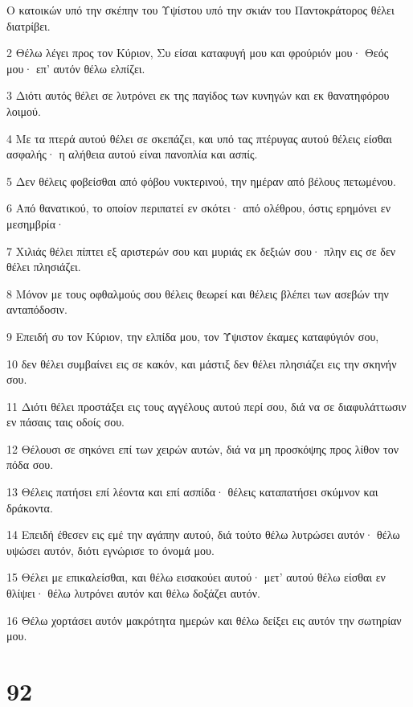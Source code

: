 \par Ο κατοικών υπό την σκέπην του Υψίστου υπό την σκιάν του Παντοκράτορος θέλει διατρίβει.
\par 2 Θέλω λέγει προς τον Κύριον, Συ είσαι καταφυγή μου και φρούριόν μου· Θεός μου· επ' αυτόν θέλω ελπίζει.
\par 3 Διότι αυτός θέλει σε λυτρόνει εκ της παγίδος των κυνηγών και εκ θανατηφόρου λοιμού.
\par 4 Με τα πτερά αυτού θέλει σε σκεπάζει, και υπό τας πτέρυγας αυτού θέλεις είσθαι ασφαλής· η αλήθεια αυτού είναι πανοπλία και ασπίς.
\par 5 Δεν θέλεις φοβείσθαι από φόβου νυκτερινού, την ημέραν από βέλους πετωμένου.
\par 6 Από θανατικού, το οποίον περιπατεί εν σκότει· από ολέθρου, όστις ερημόνει εν μεσημβρία·
\par 7 Χιλιάς θέλει πίπτει εξ αριστερών σου και μυριάς εκ δεξιών σου· πλην εις σε δεν θέλει πλησιάζει.
\par 8 Μόνον με τους οφθαλμούς σου θέλεις θεωρεί και θέλεις βλέπει των ασεβών την ανταπόδοσιν.
\par 9 Επειδή συ τον Κύριον, την ελπίδα μου, τον Ύψιστον έκαμες καταφύγιόν σου,
\par 10 δεν θέλει συμβαίνει εις σε κακόν, και μάστιξ δεν θέλει πλησιάζει εις την σκηνήν σου.
\par 11 Διότι θέλει προστάξει εις τους αγγέλους αυτού περί σου, διά να σε διαφυλάττωσιν εν πάσαις ταις οδοίς σου.
\par 12 Θέλουσι σε σηκόνει επί των χειρών αυτών, διά να μη προσκόψης προς λίθον τον πόδα σου.
\par 13 Θέλεις πατήσει επί λέοντα και επί ασπίδα· θέλεις καταπατήσει σκύμνον και δράκοντα.
\par 14 Επειδή έθεσεν εις εμέ την αγάπην αυτού, διά τούτο θέλω λυτρώσει αυτόν· θέλω υψώσει αυτόν, διότι εγνώρισε το όνομά μου.
\par 15 Θέλει με επικαλείσθαι, και θέλω εισακούει αυτού· μετ' αυτού θέλω είσθαι εν θλίψει· θέλω λυτρόνει αυτόν και θέλω δοξάζει αυτόν.
\par 16 Θέλω χορτάσει αυτόν μακρότητα ημερών και θέλω δείξει εις αυτόν την σωτηρίαν μου.

\chapter{92}

